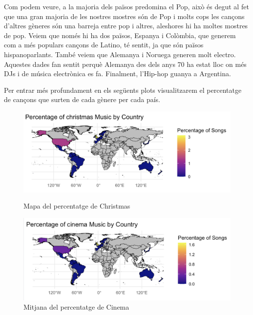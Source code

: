 Com podem veure, a la majoria dels països predomina el Pop, això és degut al fet que una gran majoria de les nostres mostres són de Pop i molts cops les cançons d'altres gèneres són una barreja entre pop i altres, aleshores hi ha moltes mostres de pop. Veiem que només hi ha dos països, Espanya i Colòmbia, que generem com a més populars cançons de Latino, té sentit, ja que són països hispanoparlants. També veiem que Alemanya i Noruega generen molt electro. Aquestes dades fan sentit perquè Alemanya des dels anys 70 ha estat lloc on més DJs i de música electrònica es fa. Finalment, l'Hip-hop guanya a Argentina.

Per entrar més profundament en els següents plots visualitzarem el percentatge de cançons que surten de cada gènere per cada país.

\begin{figure}[H]
\centering
    \begin{minipage}{.5\textwidth}
        \centering
        \includegraphics[width=0.99\linewidth]{Images/7_Geospatial/1_descriptive/percent_genere_per_pais/per_christmas.png}
        \caption{Mapa del percentatge de Christmas}
        \label{fig:geo_christmas_country}
    \end{minipage}%
    \begin{minipage}{.5\textwidth}
        \centering
        \includegraphics[width=0.99\linewidth]{Images/7_Geospatial/1_descriptive/percent_genere_per_pais/per_cinema.png}
        \caption{Mitjana del percentatge de Cinema}
        \label{fig:geo_cinema_country}
    \end{minipage}%
\end{figure}

